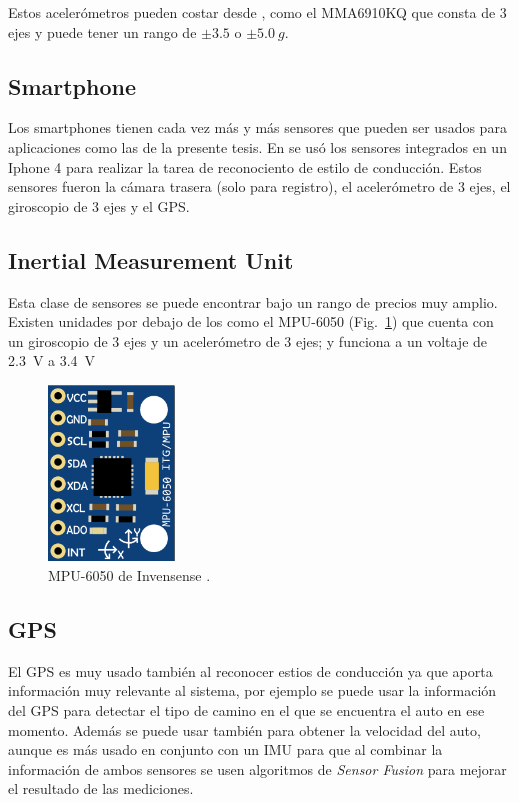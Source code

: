 Estos acelerómetros pueden costar desde , como el MMA6910KQ \cite{acelerom} que consta de 3 ejes y puede tener un rango de $\pm 3.5$ o $\pm \SI{5.0}{g} $.

\subsection{Smartphone}
Los smartphones tienen cada vez más y más sensores que pueden ser usados para aplicaciones como las de la presente tesis. En \cite{6083078} se usó los sensores integrados en un Iphone 4 para realizar la tarea de reconociento de estilo de conducción. Estos sensores fueron la cámara trasera (solo para registro), el acelerómetro de 3 ejes, el giroscopio de 3 ejes y el GPS. \newpage

\subsection{Inertial Measurement Unit}
Esta clase de sensores se puede encontrar bajo un rango de precios muy amplio. Existen unidades por debajo de los  como el MPU-6050 (Fig.~\ref{fig:2.7}) que cuenta con un giroscopio de 3 ejes y un acelerómetro de 3 ejes; y funciona a un voltaje de \SI[mode=text]{2.3}{V} a \SI[mode=text]{3.4}{V} \cite{invensense}

\begin{figure}[htpb!]
\centering
\includegraphics[width=0.3\textwidth]{Fig7}
\caption[MPU-5050 de Invensense]{MPU-6050 de Invensense \cite{invensense}.}
\label{fig:2.7}
\end{figure}

\subsection{GPS}
El GPS es muy usado también al reconocer estios de conducción ya que aporta información muy relevante al sistema, por ejemplo se puede usar la información del GPS para detectar el tipo de camino en el que se encuentra el auto en ese momento. Además se puede usar también para obtener la velocidad del auto, aunque es más usado en conjunto con un IMU para que al combinar la información de ambos sensores se usen algoritmos de {\it Sensor Fusion} para mejorar el resultado de las mediciones.

